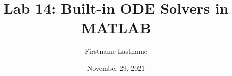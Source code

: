 \newcommand{\course}{MATH 3341}
\title{Lab 14: Built-in ODE Solvers in MATLAB}
\author{Firstname Lastname}
\date{November 29, 2021}
